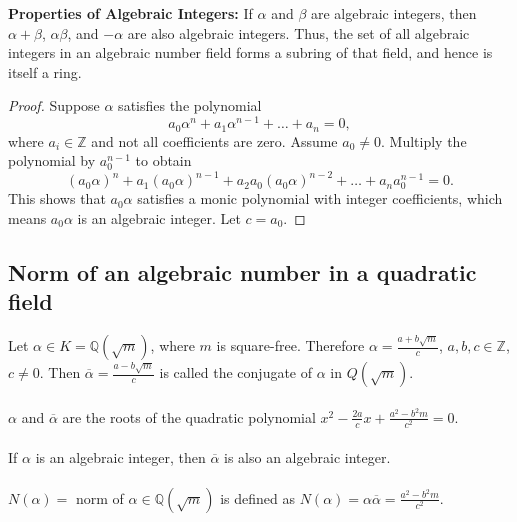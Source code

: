 \documentclass{article}
\begin{document}
\vspace{0.5em}
\noindent \textbf{Properties of Algebraic Integers:}
If \( \alpha \) and \( \beta \) are algebraic integers, then \( \alpha + \beta \), \( \alpha \beta \), and \( -\alpha \) are also algebraic integers. Thus, the set of all algebraic integers in an algebraic number field forms a subring of that field, and hence is itself a ring.


\begin{proof}
Suppose \( \alpha \) satisfies the polynomial
\[
a_0 \alpha^n + a_1 \alpha^{n-1} + \dots + a_n = 0,
\]
where \( a_i \in \mathbb{Z} \) and not all coefficients are zero. Assume \( a_0 \neq 0 \). Multiply the polynomial by \( a_0^{n-1} \) to obtain
\[
(a_0 \alpha)^n + a_1(a_0 \alpha)^{n-1} + a_2 a_0 (a_0 \alpha)^{n-2} + \dots + a_n a_0^{n-1} = 0.
\]
This shows that \( a_0 \alpha \) satisfies a monic polynomial with integer coefficients, which means \( a_0 \alpha \) is an algebraic integer. Let \( c = a_0 \).
\end{proof}

\subsection{Norm of an algebraic number in a quadratic field}

Let $\alpha \in K = \mathbb{Q}(\sqrt{m})$, where $m$ is square-free. Therefore 
$\alpha = \frac{a + b\sqrt{m}}{c}$, $a, b, c \in \mathbb{Z}$, $c \neq 0$. Then 
$\overline{\alpha} = \frac{a - b\sqrt{m}}{c}$ is called the conjugate of $\alpha$ in $Q(\sqrt{m})$.\\\\
$\alpha$ and $\overline{\alpha}$ are the roots of the quadratic polynomial $x^2 - \frac{2a}{c}x + \frac{a^2 - b^2m}{c^2} = 0$.\\\\
If $\alpha$ is an algebraic integer, then $\overline{\alpha}$ is also an algebraic integer.\\\\
$N(\alpha) =$ norm of $\alpha \in \mathbb{Q}(\sqrt{m})$ is defined as $N(\alpha) = \alpha \overline{\alpha} = \frac{a^2 - b^2m}{c^2}$.\\\\

\end{document}
